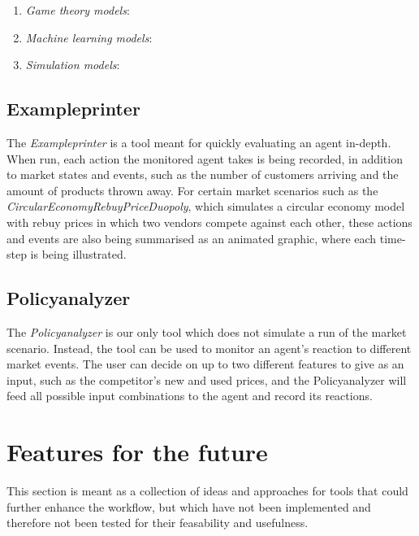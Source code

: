 \begin{enumerate}
	\item \emph{Game theory models}:
	
	\item \emph{Machine learning models}:
	
	\item \emph{Simulation models}:
\end{enumerate}

\subsection{Exampleprinter}

The \emph{Exampleprinter} is a tool meant for quickly evaluating an agent in-depth. When run, each action the monitored agent takes is being recorded, in addition to market states and events, such as the number of customers arriving and the amount of products thrown away. For certain market scenarios such as the \emph{CircularEconomyRebuyPriceDuopoly}, which simulates a circular economy model with rebuy prices in which two vendors compete against each other, these actions and events are also being summarised as an animated graphic, where each time-step is being illustrated. 

\subsection{Policyanalyzer}

The \emph{Policyanalyzer} is our only tool which does not simulate a run of the market scenario. Instead, the tool can be used to monitor an agent's reaction to different market events. The user can decide on up to two different features to give as an input, such as the competitor's new and used prices, and the Policyanalyzer will feed all possible input combinations to the agent and record its reactions. 

\section{Features for the future}

This section is meant as a collection of ideas and approaches for tools that could further enhance the workflow, but which have not been implemented and therefore not been tested for their feasability and usefulness.